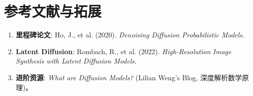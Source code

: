 \documentclass[12pt, a4paper]{article}
\begin{document}
\section{参考文献与拓展}
\begin{enumerate}
    \item \textbf{里程碑论文}: Ho, J., et al. (2020). \textit{Denoising Diffusion Probabilistic Models}.
    \item \textbf{Latent Diffusion}: Rombach, R., et al. (2022). \textit{High-Resolution Image Synthesis with Latent Diffusion Models}.
    \item \textbf{进阶资源}: \textit{What are Diffusion Models?} (Lilian Weng's Blog, 深度解析数学原理)。
\end{enumerate}
\end{document}
